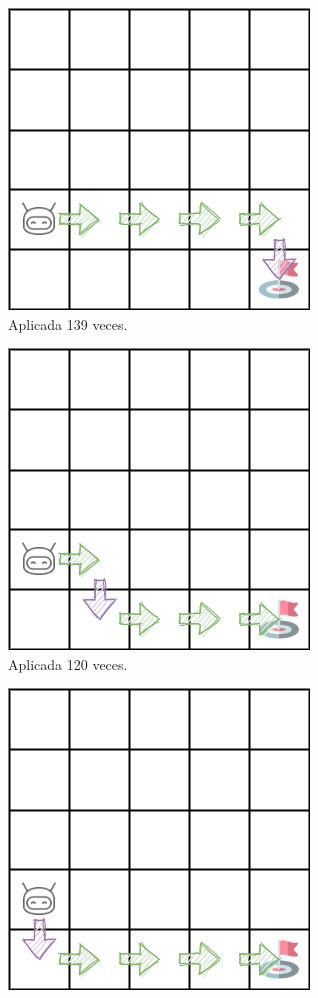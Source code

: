 \begin{figure}
    \centering
    \begin{subfigure}{.3\textwidth}
        \centering
        \includegraphics[scale=0.35]{cap5_experimentacion/images/dim5_CHANGE_ORIGIN-20_09-00_52-1, 0, 2_139.png}
        \caption{Aplicada 139 veces.}
        \label{fig:dim5_CHANGE_ORIGIN-20_09-00_52-1, 0, 2_139}
    \end{subfigure}%
    \begin{subfigure}{.3\textwidth}
        \centering
        \includegraphics[scale=0.35]{cap5_experimentacion/images/dim5_CHANGE_ORIGIN-20_09-00_52-1, 0, 2_120.png}
        \caption{Aplicada 120 veces.}
        \label{fig:dim5_CHANGE_ORIGIN-20_09-00_52-1, 0, 2_120}
    \end{subfigure}%
    \begin{subfigure}{.3\textwidth}
        \centering
        \includegraphics[scale=0.35]{cap5_experimentacion/images/dim5_CHANGE_ORIGIN-20_09-00_52-1, 0, 2_6.png}

\end{subfigure}
\end{figure}
